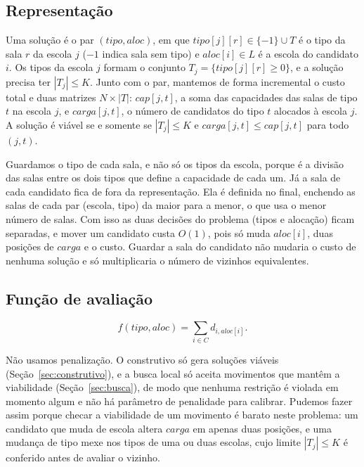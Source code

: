 \documentclass[12pt]{article}
\begin{document}
\subsection{Representação}

Uma solução é o par $(\mathit{tipo}, \mathit{aloc})$, em que
$\mathit{tipo}[j][r] \in \{-1\} \cup T$ é o tipo da sala $r$ da escola $j$ ($-1$ indica sala sem
tipo) e $\mathit{aloc}[i] \in L$ é a escola do candidato $i$. Os tipos da escola $j$ formam o
conjunto $T_j = \{\mathit{tipo}[j][r] \ge 0\}$, e a solução precisa ter $|T_j| \le K$. Junto com
o par, mantemos de forma incremental o custo total e duas matrizes $N \times |T|$:
$\mathit{cap}[j,t]$, a soma das capacidades das salas de tipo $t$ na escola $j$, e
$\mathit{carga}[j,t]$, o número de candidatos do tipo $t$ alocados à escola $j$. A solução é
viável se e somente se $|T_j| \le K$ e $\mathit{carga}[j,t] \le \mathit{cap}[j,t]$ para todo
$(j,t)$.

Guardamos o tipo de cada sala, e não só os tipos da escola, porque é a divisão das salas entre os
dois tipos que define a capacidade de cada um. Já a sala de cada candidato fica de fora da
representação. Ela é definida no final, enchendo as salas de cada par (escola, tipo) da maior para
a menor, o que usa o menor número de salas. Com isso as duas decisões do problema (tipos e
alocação) ficam separadas, e mover um candidato custa $O(1)$, pois só muda $\mathit{aloc}[i]$, duas
posições de $\mathit{carga}$ e o custo. Guardar a sala do candidato não mudaria o custo de nenhuma
solução e só multiplicaria o número de vizinhos equivalentes.

\subsection{Função de avaliação}

\begin{equation}
  f(\mathit{tipo}, \mathit{aloc}) = \sum_{i \in C} d_{i,\mathit{aloc}[i]}.
\end{equation}

Não usamos penalização. O construtivo só gera soluções viáveis (Seção~\ref{sec:construtivo}), e a
busca local só aceita movimentos que mantêm a viabilidade (Seção~\ref{sec:busca}), de modo que
nenhuma restrição é violada em momento algum e não há parâmetro de penalidade para calibrar.
Pudemos fazer assim porque checar a viabilidade de um movimento é barato neste problema: um
candidato que muda de escola altera $\mathit{carga}$ em apenas duas posições, e uma mudança de tipo
mexe nos tipos de uma ou duas escolas, cujo limite $|T_j| \le K$ é conferido antes de avaliar o
vizinho.
\end{document}
